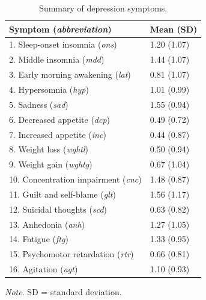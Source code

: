 \documentclass[twoside, 11pt]{article}
\begin{document}
\begin{table}[!t]
\caption{Summary of depression symptoms.}
\label{tab:3}
\begin{tabularx}{\textwidth}{p{11cm}*{1}{X}}
\toprule
 Symptom (\textit{abbreviation}) & Mean (SD) \\

\midrule
1. Sleep-onset insomnia (\textit{ons})  & 1.20 (1.07) \\
2. Middle insomnia (\textit{mdd})  & 1.44 (1.07) \\
3. Early morning awakening (\textit{lat})  & 0.81 (1.07) \\
4. Hypersomnia (\textit{hyp})  & 1.01 (0.99) \\
5. Sadness (\textit{sad})  & 1.55 (0.94) \\
6. Decreased appetite (\textit{dcp})  & 0.49 (0.72) \\
7. Increased appetite (\textit{inc})  & 0.44 (0.87) \\ 
8. Weight loss (\textit{wghtl})  & 0.50 (0.94) \\
9. Weight gain (\textit{wghtg})  & 0.67 (1.04) \\
10. Concentration impairment (\textit{cnc})  & 1.48 (0.87) \\
11. Guilt and self-blame (\textit{glt})  & 1.56 (1.17) \\
12. Suicidal thoughts (\textit{scd})  & 0.63 (0.82) \\
13. Anhedonia (\textit{anh}) & 1.27 (1.05) \\
14. Fatigue (\textit{ftg})  & 1.33 (0.95) \\
15. Psychomotor retardation (\textit{rtr})  & 0.66 (0.81) \\
16. Agitation (\textit{agt})  & 1.10 (0.93) \\
\bottomrule
\end{tabularx}

\smallskip
\small\textit{Note}. SD = standard deviation.
\end{table}
\end{document}
